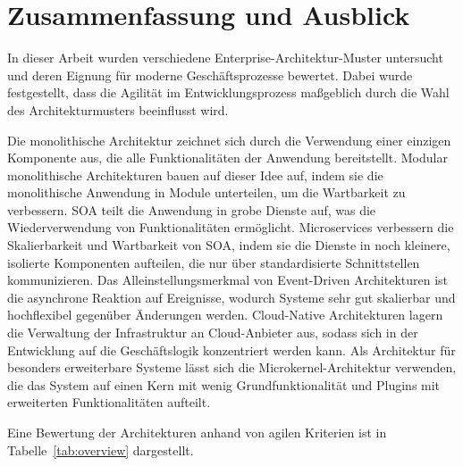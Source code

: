 \documentclass[acmtog]{acmart}
\begin{document}
\section{Zusammenfassung und Ausblick}
\label{sec:summary}
In dieser Arbeit wurden verschiedene Enterprise-Architektur-Muster untersucht und deren Eignung für moderne Geschäftsprozesse bewertet.
Dabei wurde festgestellt, dass die Agilität im Entwicklungsprozess maßgeblich durch die Wahl des Architekturmusters beeinflusst wird.

Die monolithische Architektur zeichnet sich durch die Verwendung einer einzigen Komponente aus, die alle Funktionalitäten der Anwendung bereitstellt.
Modular monolithische Architekturen bauen auf dieser Idee auf, indem sie die monolithische Anwendung in Module unterteilen, um die Wartbarkeit zu verbessern.
SOA teilt die Anwendung in grobe Dienste auf, was die Wiederverwendung von Funktionalitäten ermöglicht.
Microservices verbessern die Skalierbarkeit und Wartbarkeit von SOA, indem sie die Dienste in noch kleinere, isolierte Komponenten aufteilen, die nur über standardisierte Schnittstellen kommunizieren.
Das Alleinstellungsmerkmal von Event-Driven Architekturen ist die asynchrone Reaktion auf Ereignisse, wodurch Systeme sehr gut skalierbar und hochflexibel gegenüber Änderungen werden.
Cloud-Native Architekturen lagern die Verwaltung der Infrastruktur an Cloud-Anbieter aus, sodass sich in der Entwicklung auf die Geschäftslogik konzentriert werden kann.
Als Architektur für besonders erweiterbare Systeme lässt sich die Microkernel-Architektur verwenden, die das System auf einen Kern mit wenig Grundfunktionalität und Plugins mit erweiterten Funktionalitäten aufteilt.

Eine Bewertung der Architekturen anhand von agilen Kriterien ist in Tabelle~\ref{tab:overview} dargestellt.
\end{document}
